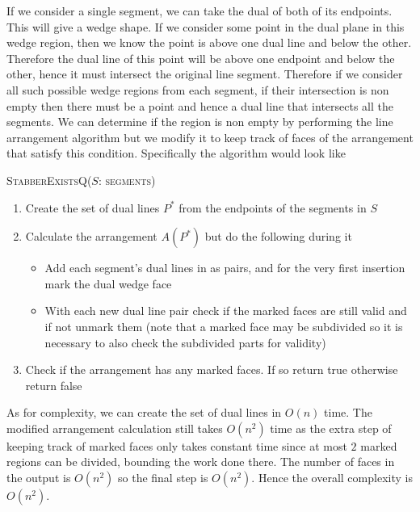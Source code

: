 \documentclass[12pt]{extarticle}
\begin{document}
\begin{solution}
    If we consider a single segment, we can take the dual of both of its endpoints. This will give a wedge shape. If we consider some point in the dual plane in this wedge region, then we know the point is above one dual line and below the other. Therefore the dual line of this point will be above one endpoint and below the other, hence it must intersect the original line segment. Therefore if we consider all such possible wedge regions from each segment, if their intersection is non empty then there must be a point and hence a dual line that intersects all the segments. We can determine if the region is non empty by performing the line arrangement algorithm but we modify it to keep track of faces of the arrangement that satisfy this condition. Specifically the algorithm would look like
    \begin{algorithm}[H]
        \caption{\textsc{StabberExistsQ($S$: segments)}}
        \begin{enumerate}
            \item Create the set of dual lines $P^*$ from the endpoints of the segments in $S$
            \item Calculate the arrangement $A(P^*)$ but do the following during it
                \begin{itemize}
                    \item Add each segment's dual lines in as pairs, and for the very first insertion mark the dual wedge face
                    \item With each new dual line pair check if the marked faces are still valid and if not unmark them (note that a marked face may be subdivided so it is necessary to also check the subdivided parts for validity)
                \end{itemize}
            \item Check if the arrangement has any marked faces. If so return true otherwise return false
        \end{enumerate}
    \end{algorithm}
    As for complexity, we can create the set of dual lines in $O(n)$ time. The modified arrangement calculation still takes $O(n^2)$ time as the extra step of keeping track of marked faces only takes constant time since at most $2$ marked regions can be divided, bounding the work done there. The number of faces in the output is $O(n^2)$ so the final step is $O(n^2)$. Hence the overall complexity is $O(n^2)$.
\end{solution}
\end{document}
